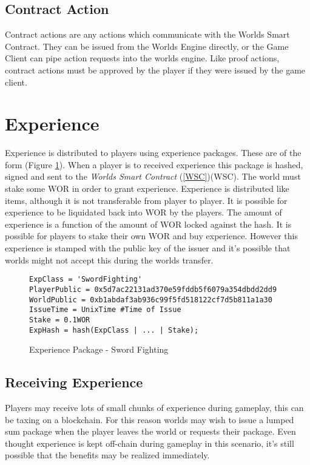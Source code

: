 \documentclass[runningheads,a4paper]{llncs}
\begin{document}
\subsection{Contract Action}
Contract actions are any actions which communicate with the Worlds Smart Contract. They can be issued from the Worlds Engine directly, or the Game Client can pipe action requests into the worlds engine. Like proof actions, contract actions must be approved by the player if they were issued by the game client. 

\section{Experience}
\label{exp}
Experience is distributed to players using experience packages. These are of the form (Figure \ref{exppkg}). When a player is to received experience this package is hashed, signed and sent to the \textit{Worlds Smart Contract} (\ref{WSC})(WSC). The world must stake some WOR in order to grant experience. Experience is distributed like items, although it is not transferable from player to player. It is possible for experience to be liquidated back into WOR by the players. The amount of experience is a function of the amount of WOR locked against the hash. It is possible for players to stake their own WOR and buy experience. However this experience is stamped with the public key of the issuer and it's possible that worlds might not accept this during the worlds transfer. 

\begin{figure}[H]
\centering
\caption{Experience Package - Sword Fighting}
\label{exppkg}
\begin{lstlisting}
ExpClass = 'SwordFighting'
PlayerPublic = 0x5d7ac22131ad370e59fddb5f6079a354dbdd2dd9
WorldPublic = 0xb1abdaf3ab936c99f5fd518122cf7d5b811a1a30
IssueTime = UnixTime #Time of Issue
Stake = 0.1WOR
ExpHash = hash(ExpClass | ... | Stake);
\end{lstlisting}
\end{figure}

\subsection{Receiving Experience} 
Players may receive lots of small chunks of experience during gameplay, this can be taxing on a blockchain. For this reason worlds may wish to issue a lumped sum package when the player leaves the world or requests their package. Even thought experience is kept off-chain during gameplay in this scenario, it's still possible that the benefits may be realized immediately.  
\end{document}
